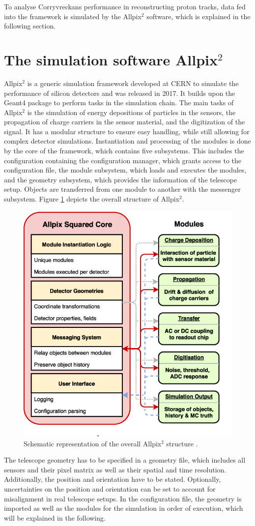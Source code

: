 To analyse Corryvreckans performance in reconstructing proton tracks, data fed into the framework is simulated by the Allpix$^2$ software,
which is explained in the following section.

\section{The simulation software Allpix$^2$}
Allpix$^2$ is a generic simulation framework developed at CERN to simulate the performance of silicon detectors and was released in 2017.
It builds upon the
Geant4 \cite{geant4} package to perform tasks in the simulation chain. The main tasks of Allpix$^2$ is the simulation of energy depositions of particles
in the sensors, the propagation of charge carriers in the sensor material, and the digitization of the signal. It has a modular
structure to ensure easy handling, while still allowing for complex detector simulations.
Instantiation and processing of the modules is done by the core of the framework,
which contains five subsystems. This includes the configuration containing the configuration manager, which grants access to the configuration file, the
module subsystem, which loads and executes the modules, and the geometry subsystem, which provides the information of the telescope setup.
Objects are transferred from one module to another with the messenger subsystem.
Figure \ref{fig:allpix} depicts the overall structure of Allpix$^2$.

\begin{figure}
  \centering
  \includegraphics[height=0.5\textwidth]{images/allpix.png}
  \caption{Schematic representation of the overall Allpix$^2$ structure \cite{fig_allpix}.}
  \label{fig:allpix}
\end{figure}

The telescope geometry has to be specified in a geometry file, which includes all sensors and their pixel matrix as well as their spatial and time
resolution. Additionally,
the position and orientation have to be stated. Optionally, uncertainties on the position and orientation can be set to account for misalignment in real
telescope setups.
In the configuration file, the geometry is imported as well as the modules for the simulation in order of execution, which
will be explained in the following.

